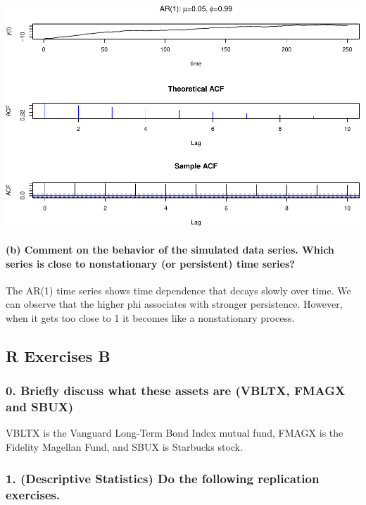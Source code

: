 \documentclass[]{article}
\let\oldparagraph\paragraph
\renewcommand{\paragraph}[1]{\oldparagraph{#1}\mbox{}}
\begin{document}
\includegraphics{homework_4_markdown_files/figure-latex/unnamed-chunk-3-4.pdf}

\paragraph{(b) Comment on the behavior of the simulated data series.
Which series is close to nonstationary (or persistent) time
series?}\label{b-comment-on-the-behavior-of-the-simulated-data-series.-which-series-is-close-to-nonstationary-or-persistent-time-series}

The AR(1) time series shows time dependence that decays slowly over
time. We can observe that the higher phi associates with stronger
persistence. However, when it gets too close to 1 it becomes like a
nonstationary process.

\subsection{R Exercises B}\label{r-exercises-b}

\subsubsection{0. Briefly discuss what these assets are (VBLTX, FMAGX
and
SBUX)}\label{briefly-discuss-what-these-assets-are-vbltx-fmagx-and-sbux}

VBLTX is the Vanguard Long-Term Bond Index mutual fund, FMAGX is the
Fidelity Magellan Fund, and SBUX is Starbucks stock.

\subsubsection{1. (Descriptive Statistics) Do the following replication
exercises.}\label{descriptive-statistics-do-the-following-replication-exercises.}
\end{document}
